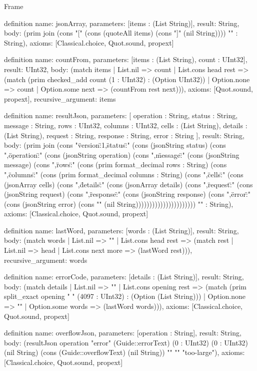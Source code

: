 \begin{lexlean}{Frame}
\begin{semanticmodule}
definition{
  name: jsonArray,
  parameters: [items : (List String)],
  result: String,
  body: (prim join (cons "[" (cons (quoteAll items) (cons "]" (nil String)))) "" : String),
  axioms: [Classical.choice, Quot.sound, propext]
}

definition{
  name: countFrom,
  parameters: [items : (List String), count : UInt32],
  result: UInt32,
  body: (match items
    | List.nil => count
    | List.cons head rest => (match (prim checked_add count (1 : UInt32) : (Option UInt32))
      | Option.none => count
      | Option.some next => (countFrom rest next))),
  axioms: [Quot.sound, propext],
  recursive_argument: items
}

definition{
  name: resultJson,
  parameters: [
    operation : String,
    status : String,
    message : String,
    rows : UInt32,
    columns : UInt32,
    cells : (List String),
    details : (List String),
    request : String,
    response : String,
    error : String
  ],
  result: String,
  body: (prim join (cons "{\"version\":1,\"status\":" (cons (jsonString status) (cons ",\"operation\":" (cons (jsonString operation) (cons ",\"message\":" (cons (jsonString message) (cons ",\"rows\":" (cons (prim format_decimal rows : String) (cons ",\"columns\":" (cons (prim format_decimal columns : String) (cons ",\"cells\":" (cons (jsonArray cells) (cons ",\"details\":" (cons (jsonArray details) (cons ",\"request\":" (cons (jsonString request) (cons ",\"response\":" (cons (jsonString response) (cons ",\"error\":" (cons (jsonString error) (cons "}" (nil String)))))))))))))))))))))) "" : String),
  axioms: [Classical.choice, Quot.sound, propext]
}

definition{
  name: lastWord,
  parameters: [words : (List String)],
  result: String,
  body: (match words
    | List.nil => ""
    | List.cons head rest => (match rest
      | List.nil => head
      | List.cons next more => (lastWord rest))),
  recursive_argument: words
}

definition{
  name: errorCode,
  parameters: [details : (List String)],
  result: String,
  body: (match details
    | List.nil => ""
    | List.cons opening rest => (match (prim split_exact opening " " (4097 : UInt32) : (Option (List String)))
      | Option.none => ""
      | Option.some words => (lastWord words))),
  axioms: [Classical.choice, Quot.sound, propext]
}

definition{
  name: overflowJson,
  parameters: [operation : String],
  result: String,
  body: (resultJson operation "error" (Guide::errorText) (0 : UInt32) (0 : UInt32) (nil String) (cons (Guide::overflowText) (nil String)) "" "" "too-large"),
  axioms: [Classical.choice, Quot.sound, propext]
}


\end{semanticmodule}
\end{lexlean}
